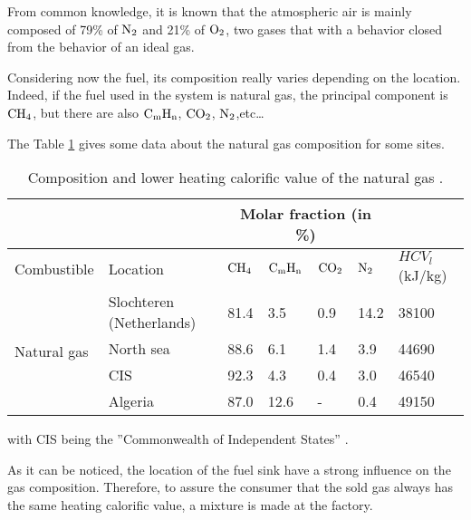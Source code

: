 From common knowledge, it is known that the atmospheric air is mainly composed of 79\% of $\ce{N2}$ and 21\% of $\ce{O2}$, two gases that with a behavior closed from the behavior of an ideal gas.

Considering now the fuel, its composition really varies depending on the location. Indeed, if the fuel used in the system is natural gas, the principal component is $\ce{CH4}$, but there are also $\ce{C}_\text{m}\ce{H}_\text{n}$, $\ce{CO2}$, $\ce{N2}$,etc\dots

The Table \ref{tab:C6_compgas} gives some data about the natural gas composition for some sites.


\begin{table}[h]
\centering
\begin{tabular}{ll|lllll}
                                &                                       & \multicolumn{4}{c}{Molar fraction (in \%)}                            &                 \\ \hline
Combustible                  & Location                              & $\ce{CH4}$ & $\ce{C}_\text{m}\ce{H}_\text{n}$ & $\ce{CO2}$ & $\ce{N2}$ & $HCV_l$ (kJ/kg) \\ \hline
\multirow{4}{*}{Natural gas} & Slochteren (Netherlands)              & 81.4       & 3.5                              & 0.9        & 14.2      & 38100           \\
                                & North sea                             & 88.6       & 6.1                              & 1.4        & 3.9       & 44690           \\
                                & CIS & 92.3       & 4.3                              & 0.4        & 3.0       & 46540           \\
                                & Algeria                               & 87.0       & 12.6                             & -          & 0.4       & 49150          
\end{tabular}
\caption{Composition and lower heating calorific value of the natural gas \cite{Leonard2018}.}
\label{tab:C6_compgas}
\end{table}
with CIS being the ''Commonwealth of Independent States'' \cite{EncyclopaediaBritannica2018}.

As it can be noticed, the location of the fuel sink have a strong influence on the gas composition. Therefore, to assure the consumer that the sold gas always has the same heating calorific value, a mixture is made at the factory.